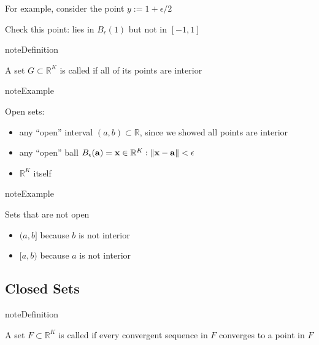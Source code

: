 \documentclass[letterpaper,10pt,english]{jupyterBook}
\begin{document}
\sphinxAtStartPar
For example, consider the point \(y := 1 + \epsilon/2\)

\sphinxAtStartPar
{} Check this point: lies in \(B_\epsilon(1)\) but not in \([-1, 1]\)

\begin{sphinxadmonition}{note}{Definition}

\sphinxAtStartPar
A set \(G\subset \mathbb{R}^K\) is called  if all of its points are interior
\end{sphinxadmonition}

\begin{sphinxadmonition}{note}{Example}

\sphinxAtStartPar
Open sets:
\begin{itemize}
\item {} 
\sphinxAtStartPar
any “open” interval \((a,b) \subset \mathbb{R}\), since we showed all points are interior

\item {} 
\sphinxAtStartPar
any “open” ball \(B_\epsilon({\bf a}) = {\bf x} \in
\mathbb{R}^K : \|{\bf x} - {\bf a} \| < \epsilon\)

\item {} 
\sphinxAtStartPar
\(\mathbb{R}^K\) itself

\end{itemize}
\end{sphinxadmonition}

\begin{sphinxadmonition}{note}{Example}

\sphinxAtStartPar
Sets that are not open
\begin{itemize}
\item {} 
\sphinxAtStartPar
\((a,b]\) because \(b\) is not interior

\item {} 
\sphinxAtStartPar
\([a,b)\) because \(a\) is not interior

\end{itemize}
\end{sphinxadmonition}


\subsection{Closed Sets}
\label{\detokenize{06.optimization_fundamentals:closed-sets}}
\begin{sphinxadmonition}{note}{Definition}

\sphinxAtStartPar
A set \(F \subset \mathbb{R}^K\) is called  if every convergent sequence in \(F\) converges to a point in \(F\)
\end{sphinxadmonition}
\end{document}
